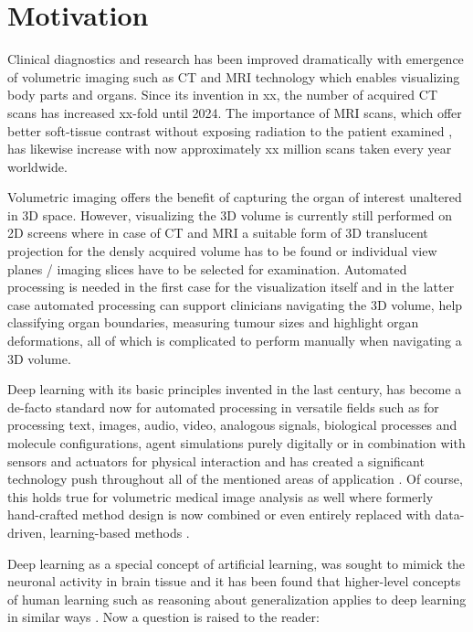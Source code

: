 \section{Motivation} %
    Clinical diagnostics and research has been improved dramatically with emergence of volumetric imaging such as \ac{CT} and \ac{MRI} technology which enables visualizing body parts and organs.
    Since its invention in xx, the number of acquired \ac{CT} scans has increased xx-fold until 2024. The importance of \ac{MRI} scans, which offer better soft-tissue contrast without exposing radiation to the patient examined \citep{xx}, has likewise increase with now approximately xx million scans taken every year worldwide.

    Volumetric imaging offers the benefit of capturing the organ of interest unaltered in \ac{3D} space. However, visualizing the \ac{3D} volume is currently still performed on \ac{2D} screens where in case of \ac{CT} and \ac{MRI} a suitable form of \ac{3D} translucent projection for the densly acquired volume has to be found or individual view planes / imaging slices have to be selected for examination. Automated processing is needed in the first case for the visualization itself and in the latter case automated processing can support clinicians navigating the \ac{3D} volume, help classifying organ boundaries, measuring tumour sizes and highlight organ deformations, all of which is complicated to perform manually when navigating a \ac{3D} volume.

    Deep learning with its basic principles invented in the last century, has become a de-facto standard now for automated processing in versatile fields such as for processing text, images, audio, video, analogous signals, biological processes and molecule configurations, agent simulations purely digitally or in combination with sensors and actuators for physical interaction \citep{xx} and has created a significant technology push throughout all of the mentioned areas of application \citep{xx}.
    Of course, this holds true for volumetric medical image analysis as well where formerly hand-crafted method design is now combined or even entirely replaced with data-driven, learning-based methods \citep{xx}.

    Deep learning as a special concept of artificial learning, was sought to mimick the neuronal activity in brain tissue and it has been found that higher-level concepts of human learning such as reasoning about generalization applies to deep learning in similar ways \citep{xx}. Now a question is raised to the reader:

